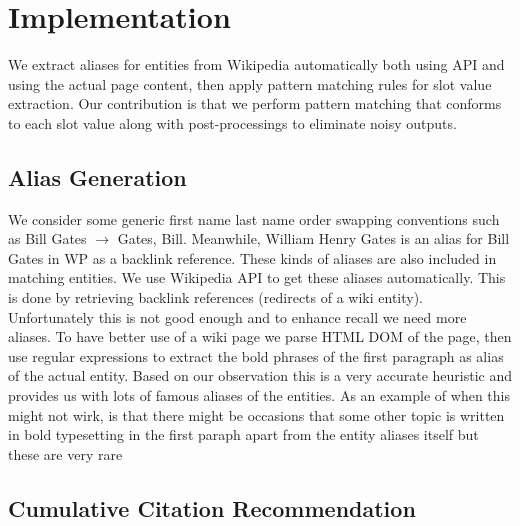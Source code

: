 

\section{Implementation}
\label{section:implementation}

We extract aliases for entities from Wikipedia automatically both using API and using the actual page content, then apply pattern matching rules for slot value extraction. Our contribution is that we perform pattern matching that conforms to each slot value along with post-processings to eliminate noisy outputs. 


\subsection{Alias Generation}
\label{section:aliasgeneration}

We consider some generic first name last name order swapping conventions such as Bill Gates $\rightarrow$ Gates, Bill.  Meanwhile, William Henry Gates is an alias for Bill Gates in WP as a backlink reference. These kinds of aliases are also included in matching entities. We use Wikipedia API to get these aliases automatically. This is done by retrieving backlink references (redirects of a wiki entity). Unfortunately this is not good enough and to enhance recall we need more aliases. To have better use of a wiki page we parse HTML DOM of the page, then use regular expressions to extract the bold phrases of the first paragraph as alias of the actual entity. Based on our observation this is a very accurate heuristic and provides us with lots of famous aliases of the entities. As an example of when this might not wirk, is that there might be occasions that some other topic is written in bold typesetting in the first paraph apart from the entity aliases itself but these are very rare

\subsection{Cumulative Citation Recommendation}
\label{sec:ccrimpl}

